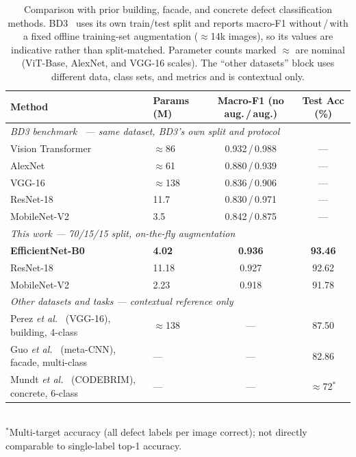 \documentclass[ASNA, twocolumn]{USG}
\begin{document}
\begin{table}[t]
\caption{Comparison with prior building, facade, and concrete defect classification methods. BD3~\cite{ref40} uses its own train/test split and reports macro-F1 without\,/\,with a fixed offline training-set augmentation ($\approx$14k images), so its values are indicative rather than split-matched. Parameter counts marked $\approx$ are nominal (ViT-Base, AlexNet, and VGG-16 scales). The ``other datasets'' block uses different data, class sets, and metrics and is contextual only.}
\label{tab:comparison}
\centering
\begin{tabular}{llcc}
\toprule
\textbf{Method} & \textbf{Params (M)} & \textbf{Macro-F1 (no aug.\,/\,aug.)} & \textbf{Test Acc (\%)} \\
\midrule
\multicolumn{4}{l}{\textit{BD3 benchmark~\cite{ref40} --- same dataset, BD3's own split and protocol}}\\
Vision Transformer~\cite{ref40} & $\approx$86  & 0.932\,/\,0.988 & --- \\
AlexNet~\cite{ref40}            & $\approx$61  & 0.880\,/\,0.939 & --- \\
VGG-16~\cite{ref40}             & $\approx$138 & 0.836\,/\,0.906 & --- \\
ResNet-18~\cite{ref40}          & 11.7         & 0.830\,/\,0.971 & --- \\
MobileNet-V2~\cite{ref40}       & 3.5          & 0.842\,/\,0.875 & --- \\
\midrule
\multicolumn{4}{l}{\textit{This work --- 70/15/15 split, on-the-fly augmentation}}\\
\textbf{EfficientNet-B0}        & \textbf{4.02}  & \textbf{0.936} & \textbf{93.46} \\
ResNet-18                       & 11.18          & 0.927 & 92.62 \\
MobileNet-V2                    & 2.23           & 0.918 & 91.78 \\
\midrule
\multicolumn{4}{l}{\textit{Other datasets and tasks --- contextual reference only}}\\
Perez \textit{et al.}~\cite{ref9} (VGG-16), building, 4-class  & $\approx$138 & --- & 87.50 \\
Guo \textit{et al.}~\cite{ref10} (meta-CNN), facade, multi-class & ---        & --- & 82.86 \\
Mundt \textit{et al.}~\cite{ref11} (CODEBRIM), concrete, 6-class & ---        & --- & $\approx$72$^{*}$ \\
\bottomrule
\end{tabular}
\\[2pt]
{\footnotesize $^{*}$Multi-target accuracy (all defect labels per image correct); not directly comparable to single-label top-1 accuracy.}
\end{table}
\end{document}
